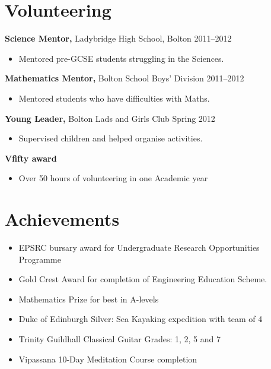 \documentclass[margin]{res}
\begin{document}
\begin{resume}
\section{Volunteering} 
               {\bf Science Mentor,} Ladybridge High School, Bolton    \hfill       2011--2012
                \begin{itemize} \itemsep -2pt
              \item Mentored pre-GCSE students struggling in the Sciences.
         		\end{itemize}
		{\bf Mathematics Mentor,} Bolton School Boys' Division \hfill 2011--2012
                \begin{itemize} \itemsep -2pt
                 \item  Mentored students who have difficulties with Maths.
		 \end{itemize}
                  {\bf  Young Leader,} Bolton Lads and Girls Club    \hfill   Spring 2012
                 \begin{itemize} \itemsep -2pt
               \item    Supervised children and helped organise activities.
		\end{itemize}
	{\bf Vfifty award}
	\begin{itemize}
	\item Over 50 hours of volunteering in one Academic year 
		 \end{itemize}

\section{Achievements} 
\begin{itemize}\itemsep -2pt
\item EPSRC bursary award for Undergraduate Research Opportunities Programme
\item Gold Crest Award for completion of Engineering Education Scheme.
\item Mathematics Prize for best in A-levels
\item Duke of Edinburgh Silver: Sea Kayaking expedition with team of 4  
\item Trinity Guildhall Classical Guitar Grades: 1, 2, 5 and 7
\item Vipassana 10-Day Meditation Course completion


\end{itemize}
\end{resume}
\end{document}
